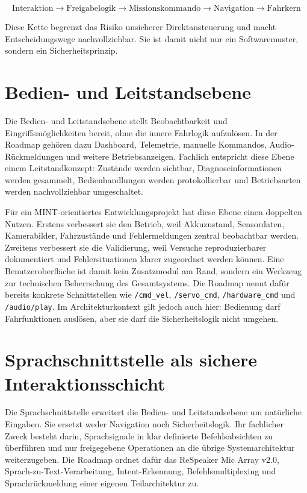 $$\text{Interaktion} \rightarrow \text{Freigabelogik} \rightarrow \text{Missionskommando} \rightarrow \text{Navigation} \rightarrow \text{Fahrkern}$$

Diese Kette begrenzt das Risiko unsicherer Direktansteuerung und macht Entscheidungswege nachvollziehbar. Sie ist damit nicht nur ein Softwaremuster, sondern ein Sicherheitsprinzip.

\section{Bedien- und Leitstandsebene}

Die Bedien- und Leitstandsebene stellt Beobachtbarkeit und Eingriffsmöglichkeiten bereit, ohne die innere Fahrlogik aufzulösen. In der Roadmap gehören dazu Dashboard, Telemetrie, manuelle Kommandos, Audio-Rückmeldungen und weitere Betriebsanzeigen. Fachlich entspricht diese Ebene einem Leitstandkonzept: Zustände werden sichtbar, Diagnoseinformationen werden gesammelt, Bedienhandlungen werden protokollierbar und Betriebsarten werden nachvollziehbar umgeschaltet.

Für ein MINT-orientiertes Entwicklungsprojekt hat diese Ebene einen doppelten Nutzen. Erstens verbessert sie den Betrieb, weil Akkuzustand, Sensordaten, Kamerabilder, Fahrzustände und Fehlermeldungen zentral beobachtbar werden. Zweitens verbessert sie die Validierung, weil Versuche reproduzierbarer dokumentiert und Fehlersituationen klarer zugeordnet werden können. Eine Benutzeroberfläche ist damit kein Zusatzmodul am Rand, sondern ein Werkzeug zur technischen Beherrschung des Gesamtsystems. Die Roadmap nennt dafür bereits konkrete Schnittstellen wie \texttt{/cmd\_vel}, \texttt{/servo\_cmd}, \texttt{/hardware\_cmd} und \texttt{/audio/play}. Im Architekturkontext gilt jedoch auch hier: Bedienung darf Fahrfunktionen auslösen, aber sie darf die Sicherheitslogik nicht umgehen.

\section{Sprachschnittstelle als sichere Interaktionsschicht}

Die Sprachschnittstelle erweitert die Bedien- und Leitstandsebene um natürliche Eingaben. Sie ersetzt weder Navigation noch Sicherheitslogik. Ihr fachlicher Zweck besteht darin, Sprachsignale in klar definierte Befehlsabsichten zu überführen und nur freigegebene Operationen an die übrige Systemarchitektur weiterzugeben. Die Roadmap ordnet dafür das ReSpeaker Mic Array v2.0, Sprach-zu-Text-Verarbeitung, Intent-Erkennung, Befehlsmultiplexing und Sprachrückmeldung einer eigenen Teilarchitektur zu.

